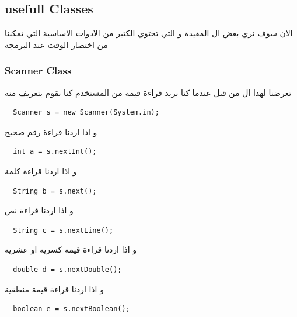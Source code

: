 \subsection{usefull Classes}
\begin{AR}
الان سوف نري بعض ال  المفيدة و التي تحتوي الكتير من الادوات الاساسية 
التي تمكننا من اختصار الوقت عند البرمجة 
\end{AR}
\subsubsection{Scanner Class}
\begin{AR}
تعرضنا لهذا ال من قبل عندما كنا نريد قراءة قيمة من المستخدم 
كنا نقوم بتعريف  منه
\end{AR}
\begin{verbatim}
  Scanner s = new Scanner(System.in);
\end{verbatim}
\begin{AR}
  و اذا اردنا قراءة رقم صحيح 
\end{AR}
\begin{verbatim}
  int a = s.nextInt();
\end{verbatim}
\begin{AR}
  و اذا اردنا قراءة كلمة 
\end{AR}
\begin{verbatim}
  String b = s.next();
\end{verbatim}
\begin{AR}
  و اذا اردنا قراءة نص
\end{AR}
\begin{verbatim}
  String c = s.nextLine();
\end{verbatim}
\begin{AR}
  و اذا اردنا قراءة قيمة كسرية او عشرية 
\end{AR}
\begin{verbatim}
  double d = s.nextDouble();
\end{verbatim}
\begin{AR}
  و اذا اردنا قراءة قيمة منطقية
\end{AR}
\begin{verbatim}
  boolean e = s.nextBoolean();
\end{verbatim}
